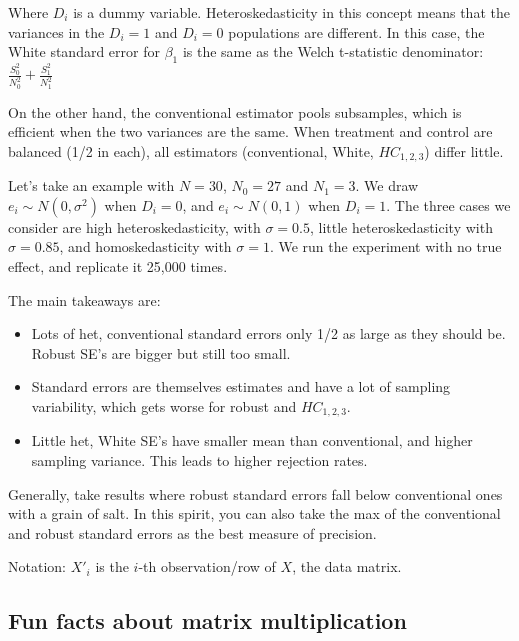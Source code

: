 \documentclass[12 pt, leqno]{article}
\begin{document}
Where $D_i$ is a dummy variable. Heteroskedasticity in this concept means that the variances in the $D_i = 1$ and $D_i = 0$ populations are different. In this case, the White standard error for $\beta_1$ is the same as the Welch t-statistic denominator: $\frac{S_0^2}{N_0^2} + \frac{S_1^2}{N_1^2}$

On the other hand, the conventional estimator pools subsamples, which is efficient when the two variances are the same. When treatment and control are balanced (1/2 in each), all estimators (conventional, White, $HC_{1,2,3}$) differ little. 

Let's take an example with $N = 30$, $N_0 = 27$ and $N_1 = 3$. We draw $e_i \sim N(0, \sigma^2)$ when $D_i = 0$, and $e_i \sim N(0, 1)$ when $D_i = 1$. The three cases we consider are high heteroskedasticity, with $\sigma = 0.5$, little heteroskedasticity with $\sigma = 0.85$, and homoskedasticity with $\sigma = 1$. We run the experiment with no true effect, and replicate it 25,000 times. 

The main takeaways are:

\begin{itemize}

\item Lots of het, conventional standard errors only 1/2 as large as they should be. Robust SE's are bigger but still too small.

\item Standard errors are themselves estimates and have a lot of sampling variability, which gets worse for robust and $HC_{1,2,3}$. 

\item Little het, White SE's have smaller mean than conventional, and higher sampling variance. This leads to higher rejection rates. 

\end{itemize}

Generally, take results where robust standard errors fall below conventional ones with a grain of salt. In this spirit, you can also take the max of the conventional and robust standard errors as the best measure of precision.

Notation: $X'_i$ is the $i$-th observation/row of $X$, the data matrix. 

\subsection*{Fun facts about matrix multiplication}
\end{document}
